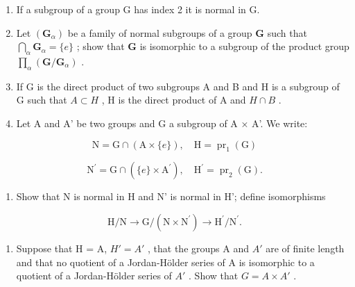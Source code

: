 \begin{enumerate}
\def\labelenumi{\arabic{enumi}.}
\setcounter{enumi}{4}
\item
  If a subgroup of a group G has index 2 it is normal in G.
\item
  Let \((\mathbf{G}_{\alpha})\) be a family of normal subgroups of a group \(\mathbf{G}\) such that \(\bigcap_{\alpha} \mathbf{G}_{\alpha} = \{e\}\) ; show that \(\mathbf{G}\) is isomorphic to a subgroup of the product group \(\prod_{\alpha} (\mathbf{G} / \mathbf{G}_{\alpha})\) .
\item
  If G is the direct product of two subgroups A and B and H is a subgroup of G such that \(A \subset H\) , H is the direct product of A and \(H \cap B\) .
\item
  Let A and A' be two groups and G a subgroup of A × A'. We write:
\end{enumerate}

\[
\mathrm{N} = \mathrm{G} \cap (\mathrm{A} \times \{e \}), \quad \mathrm{H} = \operatorname{pr} _ {1} (\mathrm{G})
\]

\[
\mathrm{N} ^ {\prime} = \mathrm{G} \cap (\{e \} \times \mathrm{A} ^ {\prime}), \quad \mathrm{H} ^ {\prime} = \operatorname{pr} _ {2} (\mathrm{G}).
\]

\begin{enumerate}
\def\labelenumi{(\alph{enumi})}
\tightlist
\item
  Show that N is normal in H and N' is normal in H'; define isomorphisms
\end{enumerate}

\[
\mathrm{H} / \mathrm{N} \rightarrow \mathrm{G} / (\mathrm{N} \times \mathrm{N} ^ {\prime}) \rightarrow \mathrm{H} ^ {\prime} / \mathrm{N} ^ {\prime}.
\]

\begin{enumerate}
\def\labelenumi{(\alph{enumi})}
\setcounter{enumi}{1}
\tightlist
\item
  Suppose that H = A, \(H' = A'\) , that the groups A and \(A'\) are of finite length and that no quotient of a Jordan-Hölder series of A is isomorphic to a quotient of a Jordan-Hölder series of \(A'\) . Show that \(G = A \times A'\) .
\end{enumerate}

